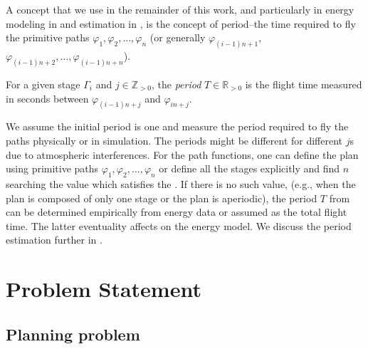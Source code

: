 A concept that we use in the remainder of this work, and particularly in energy modeling in  and estimation in , is the concept of period--the time required to fly the primitive paths $\varphi_1,\varphi_2,\dots,\varphi_n$ (or generally $\varphi_{(i-1)n+1},$ $\varphi_{(i-1)n+2},\dots,\varphi_{(i-1)n+n}$). 

\begin{highlight}
  \begin{defn}[Period]\label{def:period}
    For a given stage $\Gamma_i$ and $j\in\mathbb{Z}_{>0}$, the \emph{period} $T\in\mathbb{R}_{> 0}$ is the flight time measured in seconds between $\varphi_{(i-1)n+j}$ and $\varphi_{in+j}$.
  \end{defn} 
\end{highlight}
  
We assume the initial period is one and measure the period required to fly the paths physically or in simulation. The periods might be different for different $j$s due to atmospheric interferences. For the path functions, one can define the plan using primitive paths $\varphi_1,\varphi_2,\dots,\varphi_n$ or define all the stages explicitly and find $n$ searching the value which satisfies the . If there is no such value, (e.g., when the plan is composed of only one stage or the plan is aperiodic), the period $T$ from  can be determined empirically from energy data or assumed as the total flight time. The latter eventuality affects on the energy model. We discuss the period estimation further in .



\section{Problem Statement}

\subsection{Planning problem}
\label{sec:plan-pb}


